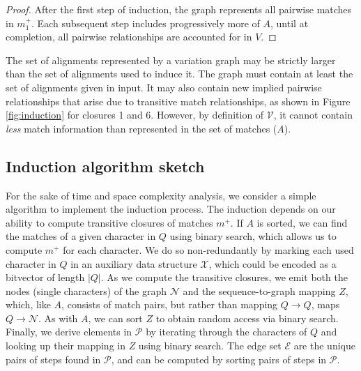 \documentclass{bioinfo}
\theoremstyle{definition}
\begin{document}
\begin{proof}
After the first step of induction, the graph represents all pairwise matches in $m_1^+$.
Each subsequent step includes progressively more of $A$, until at completion, all pairwise relationships are accounted for in $V$.
\end{proof}

The set of alignments represented by a variation graph may be strictly larger than the set of alignments used to induce it.
The graph must contain at least the set of alignments given in input.
It may also contain new implied pairwise relationships that arise due to transitive match relationships, as shown in Figure \ref{fig:induction} for closures 1 and 6.
However, by definition of $\mathcal{V}$, it cannot contain \textit{less} match information than represented in the set of matches ($A$).



\subsection{Induction algorithm sketch}

For the sake of time and space complexity analysis, we consider a simple algorithm to implement the induction process.
The induction depends on our ability to compute transitive closures of matches $m^+$.
If $A$ is sorted, we can find the matches of a given character in $Q$ using binary search, which allows us to compute $m^+$ for each character.
We do so non-redundantly by marking each used character in $Q$ in an auxiliary data structure $\mathcal{X}$, which could be encoded as a bitvector of length $|Q|$.
As we compute the transitive closures, we emit both the nodes (single characters) of the graph $\mathcal{N}$ and the sequence-to-graph mapping $Z$, which, like $A$, consists of match pairs, but rather than mapping $Q \to Q$, maps $Q \to \mathcal{N}$.
As with $A$, we can sort $Z$ to obtain random access via binary search.
Finally, we derive elements in $\mathcal{P}$ by iterating through the characters of $Q$ and looking up their mapping in $Z$ using binary search.
The edge set $\mathcal{E}$ are the unique pairs of steps found in $\mathcal{P}$, and can be computed by sorting pairs of steps in $\mathcal{P}$.
\end{document}
